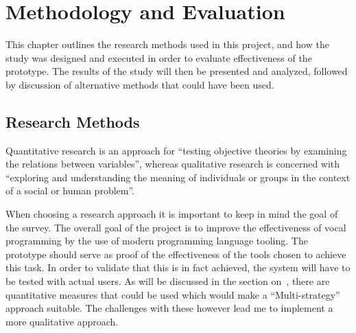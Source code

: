 \documentclass[../thesis.tex]{subfiles}
\begin{document}
\chapter{Methodology and Evaluation}\label{methodology_and_evaluation}
This chapter outlines the research methods used in this project,
and how the study was designed and executed in order to evaluate effectiveness of the prototype.
The results of the study will then be presented and analyzed, followed by
discussion of alternative methods that could have been used.




\section{Research Methods}
Quantitative research is an approach for ``testing objective theories by examining the relations between variables'', whereas qualitative research is concerned with ``exploring and understanding the meaning of individuals or groups in the context of a social or human problem''. \parencite{creswell2018}

When choosing a research approach it is important to keep in mind the goal of the survey.
The overall goal of the project is to improve the effectiveness of vocal programming by the use of modern programming language tooling.
The prototype should serve as proof of the effectiveness of the tools chosen to achieve this task.
In order to validate that this is in fact achieved, the system will have to be tested with actual users.
As will be discussed in the section on~, there are quantitative measures that could be used which would make a ``Multi-strategy'' approach suitable.
The challenges with these however lead me to implement a more qualitative approach.
\end{document}
